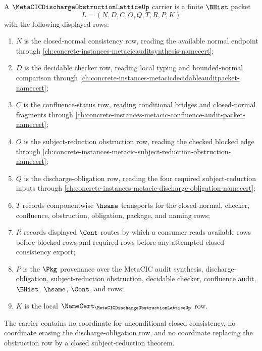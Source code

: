 \begin{definition}
\label{def:metacic-discharge-obstruction-lattice-carrier}
A $\MetaCICDischargeObstructionLatticeUp$ carrier is a finite $\BHist$ packet
$$
L=(N,D,C,O,Q,T,R,P,K)
$$
with the following displayed rows:
\begin{enumerate}
\item $N$ is the closed-normal consistency row, reading the available normal endpoint through \autoref{ch:concrete-instances-metacicauditsynthesis-namecert};
\item $D$ is the decidable checker row, reading local typing and bounded-normal comparison through \autoref{ch:concrete-instances-metacicdecidableauditpacket-namecert};
\item $C$ is the confluence-status row, reading conditional bridges and closed-normal fragments through \autoref{ch:concrete-instances-metacic-confluence-audit-packet-namecert};
\item $O$ is the subject-reduction obstruction row, reading the checked blocked edge through \autoref{ch:concrete-instances-metacic-subject-reduction-obstruction-namecert};
\item $Q$ is the discharge-obligation row, reading the four required subject-reduction inputs through \autoref{ch:concrete-instances-metacic-discharge-obligation-namecert};
\item $T$ records componentwise $\hsame$ transports for the closed-normal, checker, confluence, obstruction, obligation, package, and naming rows;
\item $R$ records displayed $\Cont$ routes by which a consumer reads available rows before blocked rows and required rows before any attempted closed-consistency export;
\item $P$ is the $\Pkg$ provenance over the MetaCIC audit synthesis, discharge-obligation, subject-reduction obstruction, decidable checker, confluence audit, $\BHist$, $\hsame$, $\Cont$, and \NameCert{} rows;
\item $K$ is the local $\NameCert_{\MetaCICDischargeObstructionLatticeUp}$ row.
\end{enumerate}
The carrier contains no coordinate for unconditional closed consistency, no coordinate erasing the discharge-obligation row, and no coordinate replacing the obstruction row by a closed subject-reduction theorem.
\end{definition}

